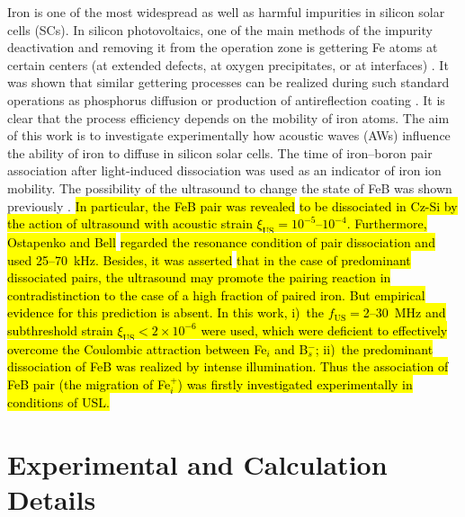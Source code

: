 \documentclass[sn-mathphys]{sn-jnl}%
\theoremstyle{thmstyleone}%
\theoremstyle{thmstyletwo}%
\theoremstyle{thmstylethree}%
\begin{document}
Iron is one of the most widespread as well as harmful impurities in silicon solar cells (SCs).
In silicon photovoltaics, one of the main methods of the impurity deactivation and removing it from the operation zone is gettering Fe atoms at certain centers (at extended defects, at oxygen precipitates, or at interfaces) \cite{LaineIEEEPV2016}.
It was shown that similar gettering processes can be realized during such standard operations as phosphorus diffusion  \cite{FeB:Vahanissi}
or production of antireflection coating  \cite{Teimuraz2014JAP}.
It is clear that the process efficiency depends on the mobility of iron atoms.
The aim of this work is to investigate experimentally how acoustic waves (AWs) influence the ability of iron to diffuse in silicon solar cells.
The time of iron--boron pair association after  light-induced dissociation was used as an indicator of iron ion mobility.
The possibility of the ultrasound to  change the state of FeB was shown previously  \cite{Ostapenko1994APL,Ostapenko1995}.
\hl{
In particular, the
FeB pair was revealed} \cite{Ostapenko1995}
\hl{ to be dissociated in Cz-Si by the action of ultrasound with acoustic strain $\xi_\mathrm{US}=10^{-5}$--$10^{-4}$.
Furthermore, Ostapenko and Bell} \cite{Ostapenko1995} \hl{regarded the resonance condition of pair dissociation and used 25--70~kHz.
Besides, it was asserted} \cite{Ostapenko1994APL} \hl{that in the case of
predominant dissociated pairs, the ultrasound may promote the pairing reaction in contradistinction to the case of a
high fraction of paired iron.
But  empirical evidence  for this prediction  is absent.
In this work,
i)~the $f_\mathrm{US}=$2--30~MHz and subthreshold strain $\xi_\mathrm{US}<2\times10^{-6}$ were used, which were deficient to effectively overcome the Coulombic attraction between Fe$_i$ and B$_s^-$;
ii)~the predominant  dissociation of FeB was realized by intense illumination.
Thus the association of FeB pair (the migration  of Fe$_i^+$) was firstly investigated experimentally in conditions of USL.}


\section{Experimental and Calculation Details}
\label{sec:1}
\end{document}
